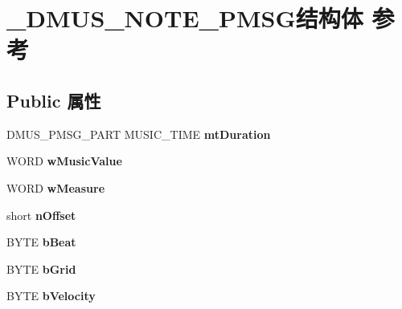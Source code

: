 \hypertarget{struct___d_m_u_s___n_o_t_e___p_m_s_g}{}\section{\+\_\+\+D\+M\+U\+S\+\_\+\+N\+O\+T\+E\+\_\+\+P\+M\+S\+G结构体 参考}
\label{struct___d_m_u_s___n_o_t_e___p_m_s_g}
\subsection*{Public 属性}
\begin{DoxyCompactItemize}
\item 
\mbox{\label{struct___d_m_u_s___n_o_t_e___p_m_s_g_a05825e4df0e6af168f117f3c8cac6cf6}} 
D\+M\+U\+S\+\_\+\+P\+M\+S\+G\+\_\+\+P\+A\+RT M\+U\+S\+I\+C\+\_\+\+T\+I\+ME {\bfseries mt\+Duration}
\item 
\mbox{\label{struct___d_m_u_s___n_o_t_e___p_m_s_g_a90b418d834caaa49cdb7b3680ed87432}} 
W\+O\+RD {\bfseries w\+Music\+Value}
\item 
\mbox{\label{struct___d_m_u_s___n_o_t_e___p_m_s_g_a7ab177ccb668ab0ff286d6e47735b8da}} 
W\+O\+RD {\bfseries w\+Measure}
\item 
\mbox{\label{struct___d_m_u_s___n_o_t_e___p_m_s_g_ae60953f67644569427770d6c4cf2f8d5}} 
short {\bfseries n\+Offset}
\item 
\mbox{\label{struct___d_m_u_s___n_o_t_e___p_m_s_g_a1b2195fe709a3a6ba27240285358b37c}} 
B\+Y\+TE {\bfseries b\+Beat}
\item 
\mbox{\label{struct___d_m_u_s___n_o_t_e___p_m_s_g_a49bf493e7724061540479842c3125170}} 
B\+Y\+TE {\bfseries b\+Grid}
\item 
\mbox{\label{struct___d_m_u_s___n_o_t_e___p_m_s_g_a0a0e32d34d53bda3e91bc7b983f4cce6}} 
B\+Y\+TE {\bfseries b\+Velocity}
\item 
\mbox{\label{struct___d_m_u_s___n_o_t_e___p_m_s_g_ac60d76a195155a235d4ca6f422178b8b}} 

\end{DoxyCompactItemize}

